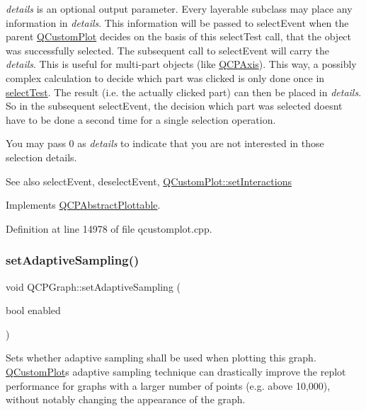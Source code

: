 {\itshape details} is an optional output parameter. Every layerable subclass may place any information in {\itshape details}. This information will be passed to select\+Event when the parent \hyperlink{class_q_custom_plot}{Q\+Custom\+Plot} decides on the basis of this select\+Test call, that the object was successfully selected. The subsequent call to select\+Event will carry the {\itshape details}. This is useful for multi-\/part objects (like \hyperlink{class_q_c_p_axis}{Q\+C\+P\+Axis}). This way, a possibly complex calculation to decide which part was clicked is only done once in \hyperlink{class_q_c_p_graph_a36011c34aca4f7a477de25961e2f6c13}{select\+Test}. The result (i.\+e. the actually clicked part) can then be placed in {\itshape details}. So in the subsequent select\+Event, the decision which part was selected doesn\textquotesingle{}t have to be done a second time for a single selection operation.

You may pass 0 as {\itshape details} to indicate that you are not interested in those selection details.

\begin{DoxySeeAlso}{See also}
select\+Event, deselect\+Event, \hyperlink{class_q_custom_plot_a5ee1e2f6ae27419deca53e75907c27e5}{Q\+Custom\+Plot\+::set\+Interactions} 
\end{DoxySeeAlso}


Implements \hyperlink{class_q_c_p_abstract_plottable_a38efe9641d972992a3d44204bc80ec1d}{Q\+C\+P\+Abstract\+Plottable}.



Definition at line 14978 of file qcustomplot.\+cpp.

\mbox{\label{class_q_c_p_graph_ab468cd600160f327836aa0644291e64c}} 
\subsubsection{\texorpdfstring{set\+Adaptive\+Sampling()}{setAdaptiveSampling()}}
{\footnotesize\ttfamily void Q\+C\+P\+Graph\+::set\+Adaptive\+Sampling (\begin{DoxyParamCaption}\item[{bool}]{enabled }\end{DoxyParamCaption})}

Sets whether adaptive sampling shall be used when plotting this graph. \hyperlink{class_q_custom_plot}{Q\+Custom\+Plot}\textquotesingle{}s adaptive sampling technique can drastically improve the replot performance for graphs with a larger number of points (e.\+g. above 10,000), without notably changing the appearance of the graph.


